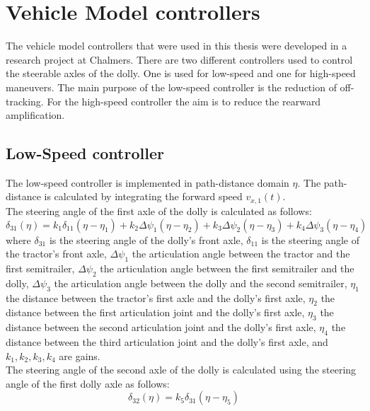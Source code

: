 \documentclass[ExampleMasters.tex]{subfiles}
\begin{document}
\clearpage
{\pagestyle{empty}\cleardoublepage}%
\chapter{Vehicle Model controllers}
\label{chap:steering_model}
The vehicle model controllers that were used in this thesis were developed in a research project at Chalmers.
There are two different controllers used to control the steerable axles of the dolly. One is used for low-speed and one for high-speed maneuvers. The main purpose of the low-speed controller is the reduction of off-tracking.
For the high-speed controller the aim is to reduce the rearward amplification.
\section[Low-Speed controller]{Low-Speed controller \cite{Low-speed_paper}}
\label{sec:low-speed_controller}
The low-speed controller is implemented in path-distance domain $\eta$. The path-distance is calculated by integrating the forward speed $v_{x,1}(t)$. \\
The steering angle of the first axle of the dolly is calculated as follows: 
\begin{equation}
\delta_{31}(\eta)=k_1\delta_{11}(\eta-\eta_1)+k_2\Delta\psi_1(\eta-\eta_2)+k_3\Delta\psi_2(\eta-\eta_3)+k_4\Delta\psi_3(\eta-\eta_4)
\end{equation}
\label{eq:delta31_lowspeed}
where $\delta_{31}$ is the steering angle of the dolly's front axle, $\delta_{11}$ is the steering angle of the tractor's front axle, $\Delta\psi_1$ the articulation angle between the tractor and the first semitrailer, $\Delta\psi_2$ the articulation angle between the first semitrailer and the dolly, $\Delta\psi_3$ the articulation angle between the dolly and the second semitrailer, $\eta_1$ the distance between the tractor's first axle and the dolly's first axle, $\eta_2$ the distance between the first articulation joint and the dolly's first axle, $\eta_3$ the distance between the second articulation joint and the dolly's first axle, $\eta_4$ the distance between the third articulation joint and the dolly's first axle, and $k_1, k_2, k_3, k_4$ are gains. 
\\The steering angle of the second axle of the dolly is calculated using the steering angle of the first dolly axle as follows:
\begin{equation}
\delta_{32}(\eta)=k_5\delta_{31}(\eta-\eta_5)
\end{equation}
\label{eq:delta32_lowspeed}
\end{document}

